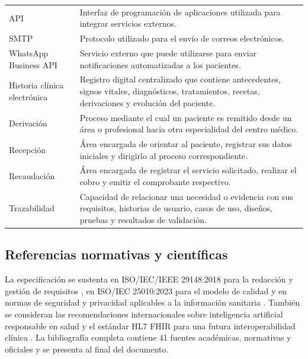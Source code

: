 \documentclass[11pt,a4paper]{article}
\begin{document}
\begin{longtable}{p{} p{}}
		API &
		Interfaz de programación de aplicaciones utilizada para integrar servicios externos. \\
		
		SMTP &
		Protocolo utilizado para el envío de correos electrónicos. \\
		
		WhatsApp Business API &
		Servicio externo que puede utilizarse para enviar notificaciones automatizadas a los pacientes. \\
		
		Historia clínica electrónica &
		Registro digital centralizado que contiene antecedentes, signos vitales, diagnósticos, tratamientos, recetas, derivaciones y evolución del paciente. \\
		
		Derivación &
		Proceso mediante el cual un paciente es remitido desde un área o profesional hacia otra especialidad del centro médico. \\
		
		Recepción &
		Área encargada de orientar al paciente, registrar sus datos iniciales y dirigirlo al proceso correspondiente. \\
		
		Recaudación &
		Área encargada de registrar el servicio solicitado, realizar el cobro y emitir el comprobante respectivo. \\
		
		Trazabilidad &
		Capacidad de relacionar una necesidad o evidencia con sus requisitos, historias de usuario, casos de uso, diseños, pruebas y resultados de validación. \\
		
	\end{longtable}
	
	
	\subsection{ Referencias normativas y científicas}
	
	La especificación se sustenta en ISO/IEC/IEEE 29148:2018 para la redacción y
	gestión de requisitos \cite{iso29148}, en ISO/IEC 25010:2023 para el modelo de
	calidad \cite{iso25010} y en normas de seguridad y privacidad aplicables a la
	información sanitaria \cite{iso27001,iso27799,loppd}. También se consideran
	las recomendaciones internacionales sobre inteligencia artificial responsable
	en salud \cite{whoai2021} y el estándar HL7 FHIR para una futura
	interoperabilidad clínica \cite{hl7fhir}. La bibliografía completa contiene
	41 fuentes académicas, normativas y oficiales y se presenta al final del
	documento.
	
\end{document}
